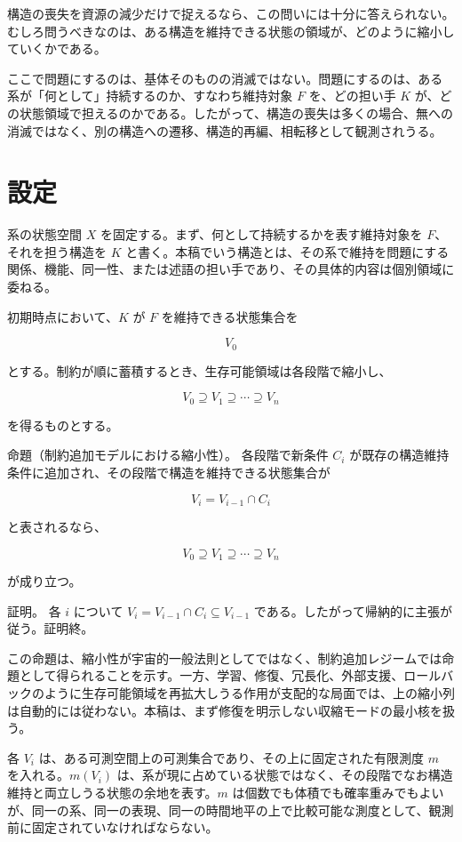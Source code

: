 \documentclass[12pt,a4paper]{article}
\begin{document}
構造の喪失を資源の減少だけで捉えるなら、この問いには十分に答えられない。むしろ問うべきなのは、ある構造を維持できる状態の領域が、どのように縮小していくかである。

ここで問題にするのは、基体そのものの消滅ではない。問題にするのは、ある系が「何として」持続するのか、すなわち維持対象 \(F\) を、どの担い手 \(K\) が、どの状態領域で担えるのかである。したがって、構造の喪失は多くの場合、無への消滅ではなく、別の構造への遷移、構造的再編、相転移として観測されうる。

\section{設定}\label{ux8a2dux5b9a}

系の状態空間 \(X\) を固定する。まず、何として持続するかを表す維持対象を \(F\)、それを担う構造を \(K\) と書く。本稿でいう構造とは、その系で維持を問題にする関係、機能、同一性、または述語の担い手であり、その具体的内容は個別領域に委ねる。

初期時点において、\(K\) が \(F\) を維持できる状態集合を

\[
V_0
\]

とする。制約が順に蓄積するとき、生存可能領域は各段階で縮小し、

\[
V_0 \supseteq V_1 \supseteq \cdots \supseteq V_{n}
\]

を得るものとする。

命題（制約追加モデルにおける縮小性）。 各段階で新条件 \(C_{i}\) が既存の構造維持条件に追加され、その段階で構造を維持できる状態集合が

\[
V_{i} = V_{i-1} \cap C_{i}
\]

と表されるなら、

\[
V_0 \supseteq V_1 \supseteq \cdots \supseteq V_{n}
\]

が成り立つ。

証明。 各 \(i\) について \(V_{i} = V_{i-1} \cap C_{i} \subseteq V_{i-1}\) である。したがって帰納的に主張が従う。証明終。

この命題は、縮小性が宇宙的一般法則としてではなく、制約追加レジームでは命題として得られることを示す。一方、学習、修復、冗長化、外部支援、ロールバックのように生存可能領域を再拡大しうる作用が支配的な局面では、上の縮小列は自動的には従わない。本稿は、まず修復を明示しない収縮モードの最小核を扱う。

各 \(V_{i}\) は、ある可測空間上の可測集合であり、その上に固定された有限測度 \(m\) を入れる。\(m(V_{i})\) は、系が現に占めている状態ではなく、その段階でなお構造維持と両立しうる状態の余地を表す。\(m\) は個数でも体積でも確率重みでもよいが、同一の系、同一の表現、同一の時間地平の上で比較可能な測度として、観測前に固定されていなければならない。
\end{document}
